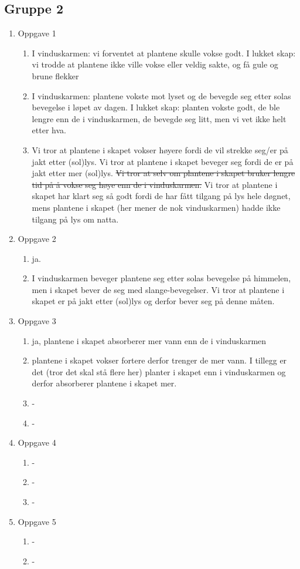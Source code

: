 \subsection{Gruppe 2}
\begin{enumerate}
	\item Oppgave 1
	\begin{enumerate}
		\item I vinduskarmen: vi forventet at plantene skulle vokse godt. I lukket skap: vi trodde at plantene ikke ville vokse eller veldig sakte, og få gule og brune flekker
		\item I vinduskarmen: plantene vokste mot lyset og de bevegde seg etter solas bevegelse i løpet av dagen. I lukket skap: planten vokste godt, de ble lengre enn de i vinduskarmen, de bevegde seg litt, men vi vet ikke helt etter hva.
		\item Vi tror at plantene i skapet vokser høyere fordi de vil strekke seg/er på jakt etter (sol)lys. Vi tror at plantene i skapet beveger seg fordi de er på jakt etter mer (sol)lys. \sout{Vi tror at selv om plantene i skapet bruker lengre tid på å vokse seg høye enn de i vinduskarmen.} Vi tror at plantene i skapet har klart seg så godt fordi de har fått tilgang på lys hele døgnet, mens plantene i skapet (her mener de nok vinduskarmen) hadde ikke tilgang på lys om natta.
	\end{enumerate}

	\item Oppgave 2
	\begin{enumerate}
		\item ja.
		\item I vinduskarmen beveger plantene seg etter solas bevegelse på himmelen, men i skapet bever de seg med slange-bevegelser. Vi tror at plantene i skapet er på jakt etter (sol)lys og derfor bever seg på denne måten.
	\end{enumerate}	

	\item Oppgave 3
	\begin{enumerate}
		\item ja, plantene i skapet absorberer mer vann enn de i vinduskarmen
		\item plantene i skapet vokser fortere derfor trenger de mer vann. I tillegg er det (tror det skal stå flere her) planter i skapet enn i vinduskarmen og derfor absorberer plantene i skapet mer.
		\item -
		\item -
	\end{enumerate}

	\item Oppgave 4
	\begin{enumerate}
		\item -
		\item -
		\item -
	\end{enumerate}

	\item Oppgave 5
	\begin{enumerate}
		\item -
		\item -
	\end{enumerate}
\end{enumerate}

